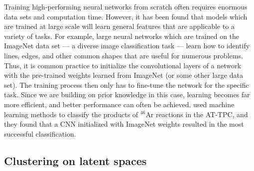 \documentclass[review,number,sort&compress]{elsarticle}
\begin{document}


Training high-performing neural networks from scratch often requires enormous data sets and computation time. However, it has been found that models which are trained at large scale will learn general features that are applicable to a variety of tasks. For example, large neural networks which are trained on the ImageNet data set \cite{Russakovsky2015} --- a diverse image classification task --- learn how to identify lines, edges, and other common shapes that are useful for numerous problems. Thus, it is common practice to initialize the convolutional layers of a network with the pre-trained weights learned from ImageNet (or some other large data set). The training process then only has to fine-tune the network for the specific task. Since we are building on prior knowledge in this case, learning becomes far more efficient, and better performance can often be achieved. \citet{Kuchera2019} used machine learning methods to classify the products of $^{46}$Ar reactions in the AT-TPC, and they found that a CNN initialized with ImageNet weights resulted in the most successful classification.

\subsection{Clustering on latent spaces}

\end{document}
